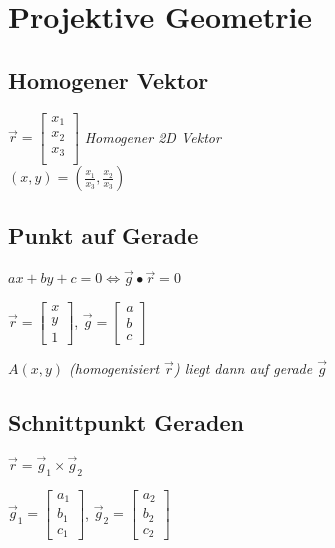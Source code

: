 \section{Projektive Geometrie}

\subsection{Homogener Vektor}

$\vec{r} = \begin{bmatrix}
    x_1 \\
    x_2 \\
    x_3 \\
\end{bmatrix}$
\textit{Homogener 2D Vektor} \\

$(x,y) = (\frac{x_1}{x_3}, \frac{x_2}{x_3})$

\subsection{Punkt auf Gerade}

$ax + by + c = 0 \Leftrightarrow \vec{g} \bullet \vec{r} = 0$

$\vec{r} = \begin{bmatrix}
    x \\ y \\ 1
\end{bmatrix}$,
$\vec{g} = \begin{bmatrix}
    a \\ b \\ c
\end{bmatrix}$

\textit{$A(x,y)$ (homogenisiert $\vec{r}$) liegt dann auf gerade $\vec{g}$}

\subsection{Schnittpunkt Geraden}

$\vec{r} = \vec{g}_1 \times \vec{g}_2$

$\vec{g}_1 = \begin{bmatrix}
    a_1 \\ b_1 \\ c_1
\end{bmatrix}$,
$\vec{g}_2 =  \begin{bmatrix}
    a_2 \\ b_2 \\ c_2
\end{bmatrix}$

